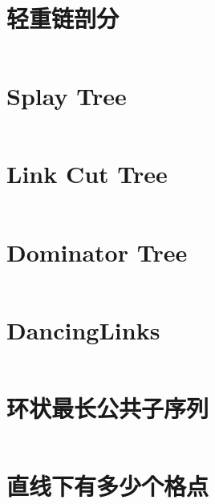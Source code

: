 \documentclass[titlepage,landscape,a4paper,10pt]{article}
\begin{document}
\begin{multicols}{2}
\begin{spacing}{0.8}
\section{轻重链剖分}
\inputminted{cpp}{src/轻重链剖分.cpp}


\section{Splay Tree}
\inputminted{cpp}{src/Splay.cpp}

\section{Link Cut Tree}
\inputminted{cpp}{improve/LCT.cpp}

\section{Dominator Tree}
\inputminted{cpp}{improve/DominatorTree.cpp}

\section{DancingLinks}
\inputminted{cpp}{src/DancingLinks.cpp}
%

%

%

\section{环状最长公共子序列}
\inputminted{cpp}{improve/CycleLongest.cpp}

\section{直线下有多少个格点}
\inputminted{cpp}{src/直线下格点统计.cpp}


\end{spacing}
\end{multicols}
\end{document}
